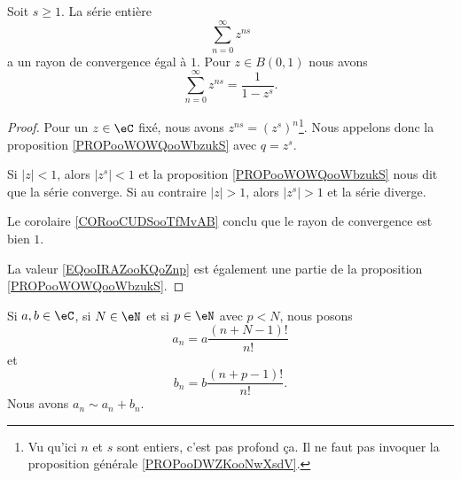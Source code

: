 \begin{lemma}       \label{LEMooRJOKooPJGVTr}
    Soit \( s\geq 1\). La série entière
    \begin{equation}
        \sum_{n=0}^{\infty}z^{ns}
    \end{equation}
    a un rayon de convergence égal à \( 1\). Pour \(z\in B(0,1)\) nous avons
    \begin{equation}        \label{EQooIRAZooKQoZnp}
        \sum_{n=0}^{\infty}z^{ns}=\frac{1}{ 1-z^s }.
    \end{equation}
\end{lemma}

\begin{proof}
    Pour un \( z\in \eC\) fixé, nous avons \( z^{ns}=(z^s)^n\)\footnote{Vu qu'ici \( n\) et \( s\) sont entiers, c'est pas profond ça. Il ne faut pas invoquer la proposition générale \ref{PROPooDWZKooNwXsdV}.}. Nous appelons donc la proposition \ref{PROPooWOWQooWbzukS} avec \( q=z^s\).

    Si \( | z |<1\), alors \( | z^s |<1\) et la proposition \ref{PROPooWOWQooWbzukS} nous dit que la série converge. Si au contraire \( | z |>1\), alors \( | z^s |>1\) et la série diverge.

    Le corolaire \ref{CORooCUDSooTfMvAB} conclu que le rayon de convergence est bien \( 1\).

    La valeur \eqref{EQooIRAZooKQoZnp} est également une partie de la proposition \ref{PROPooWOWQooWbzukS}.
\end{proof}


\begin{lemma}       \label{LEMooVMLEooCzPuKy}
    Si \( a,b\in \eC\), si \( N\in \eN\) et si \( p\in \eN\) avec \( p<N\), nous posons
    \begin{equation}
        a_n=a\frac{ (n+N-1)! }{ n! }
    \end{equation}
    et 
    \begin{equation}
        b_n=b\frac{ (n+p-1)! }{ n! }.
    \end{equation}
    Nous avons \( a_n\sim a_n+b_n\).
\end{lemma}

